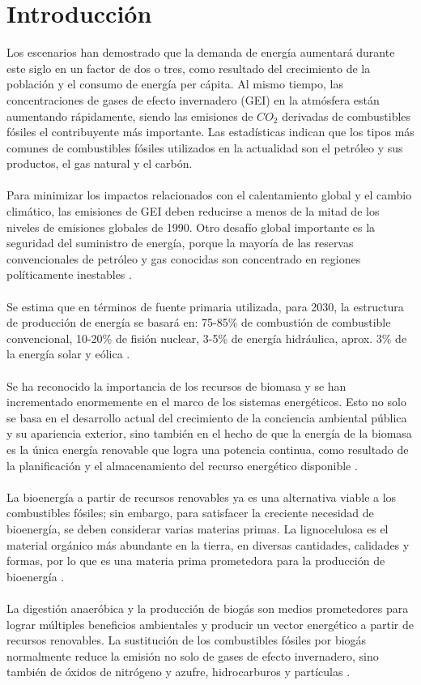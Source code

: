 \documentclass[a4paper,11pt]{article}
\begin{document}
\section{Introducción}
Los escenarios han demostrado que la demanda de energía aumentará durante este siglo en un factor de dos o tres, como resultado del crecimiento de la población y el consumo de energía per cápita. Al mismo tiempo, las concentraciones de gases de efecto invernadero (GEI) en la atmósfera están aumentando rápidamente, siendo las emisiones de $CO_{2}$ derivadas de combustibles fósiles el contribuyente más importante. Las estadísticas indican que los tipos más comunes de combustibles fósiles utilizados en la actualidad son el petróleo y sus productos, el gas natural y el carbón.
\\\\
Para minimizar los impactos relacionados con el calentamiento global y el cambio climático, las emisiones de GEI deben reducirse a menos de la mitad de los niveles de emisiones globales de 1990. Otro desafío global importante es la seguridad del suministro de energía, porque la mayoría de las reservas convencionales de petróleo y gas conocidas son concentrado en regiones políticamente inestables \cite{Weiland2010}. 
\\\\
Se estima que en términos de fuente primaria utilizada, para 2030, la estructura de producción de energía se basará en: 75-85\% de combustión de combustible convencional, 10-20\% de fisión nuclear, 3-5\% de energía hidráulica, aprox. 3\% de la energía solar y eólica \cite{Popescu2010}.
\\\\
Se ha reconocido la importancia de los recursos de biomasa y se han incrementado enormemente en el marco de los sistemas energéticos. Esto no solo se basa en el desarrollo actual del crecimiento de la conciencia ambiental pública y su apariencia exterior, sino también en el hecho de que la energía de la biomasa es la única energía renovable que logra una potencia continua, como resultado de la planificación y el almacenamiento del recurso energético disponible \cite{Koenig2008}.
\\\\
La bioenergía a partir de recursos renovables ya es una alternativa viable a los combustibles fósiles; sin embargo, para satisfacer la creciente necesidad de bioenergía, se deben considerar varias materias primas. La lignocelulosa es el material orgánico más abundante en la tierra, en diversas cantidades, calidades y formas, por lo que es una materia prima prometedora para la producción de bioenergía \cite{Petersson2007}.
\\\\
La digestión anaeróbica y la producción de biogás son medios prometedores para lograr múltiples beneficios ambientales y producir un vector energético a partir de recursos renovables. La sustitución de los combustibles fósiles por biogás normalmente reduce la emisión no solo de gases de efecto invernadero, sino también de óxidos de nitrógeno y azufre, hidrocarburos y partículas \cite{Boerjesson2006}.
\end{document}
